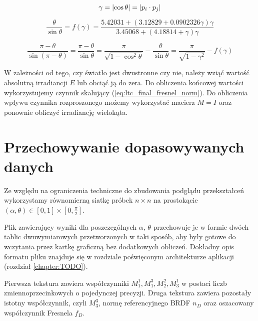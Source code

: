 \documentclass[../main.tex]{subfiles}
\begin{document}
\begin{equation}
\gamma = \abs{\cos\theta} = \abs{p_i \cdot p_j}
\label{eq:ltc_gamma_def}
\end{equation}

\begin{equation}
\frac{\theta}{\sin\theta} = f(\gamma) = \frac{
    5.42031 + \left( 3.12829 + 0.0902326 \gamma \right) \gamma
}{
    3.45068 + \left( 4.18814 + \gamma \right) \gamma
}
\label{ltc_gamma_approx_positive}
\end{equation}

\begin{equation}
    \frac{\pi - \theta}{\sin\left( \pi-\theta \right)} =
    \frac{\pi - \theta}{\sin\theta} = 
    \frac{\pi}{\sqrt{1-\cos^{2}\theta}} - \frac{\theta}{\sin\theta} =
    \frac{\pi}{\sqrt{1-\gamma^2}} - f(\gamma)
\label{ltc_gamma_approx_negative}
\end{equation}

W zależności od tego, czy światło jest dwustronne czy nie, należy wziąć wartość absolutną irradiancji $E$ lub obciąć ją do zera. Do obliczenia końcowej wartości wykorzystujemy czynnik skalujący (\ref{eq:ltc_final_fresnel_norm}). Do obliczenia wpływu czynnika rozproszonego możemy wykorzystać macierz $M = I$ oraz ponownie obliczyć irradiancję wielokąta.

\section{Przechowywanie dopasowywanych danych}

Ze względu na ograniczenia techniczne do zbudowania podglądu przekształceń wykorzystamy równomierną siatkę próbek $n \times n$ na prostokącie $(\alpha, \theta) \in \left[0,1\right] \times \left[0, \frac{\pi}{2}\right]$.

Plik zawierający wyniki dla poszczególnych $\alpha$, $\theta$ przechowuje je w formie dwóch tablic dwuwymiarowych przetworzonych w taki sposób, aby były gotowe do wczytania przez kartkę graficzną bez dodatkowych obliczeń. Dokładny opis formatu pliku znajduje się w rozdziale poświęconym architekturze aplikacji (rozdział \ref{chapter:TODO}).

Pierwsza tekstura zawiera współczynniki $M_{1}^{1}, M_{1}^{3}, M_{2}^{2}, M_{3}^{1}$ w postaci liczb zmiennoprzecinkowych o pojedynczej precyzji. Druga tekstura zawiera pozostały istotny współczynnik, czyli $M_{3}^{3}$, normę referencyjnego BRDF $n_D$ oraz oszacowany współczynnik Fresnela $f_D$.
\end{document}
